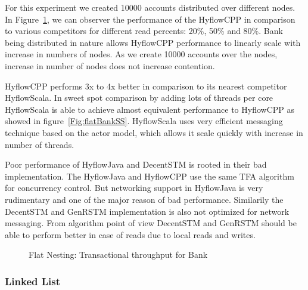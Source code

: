 \documentclass[12pt,english]{report}
\begin{document}
For this experiment we created 10000 accounts distributed over different nodes. In Figure~\ref{Fig:flatBank}, we can observer the performance of the HyflowCPP in comparison to various competitors for different read percents: 20\%, 50\% and 80\%. Bank being distributed in nature allows HyflowCPP performance to linearly scale with increase in numbers of nodes. As we create 10000 accounts over the nodes, increase in number of nodes does not increase contention.

HyflowCPP performs 3x to 4x better in comparison to its nearest competitor HyflowScala. In sweet spot comparison by adding lots of threads per core HyflowScala is able to achieve almost equivalent performance to HyflowCPP as showed in figure~\ref{Fig:flatBankSS}. HyflowScala uses very efficient messaging technique based on the actor model, which allows it scale quickly with increase in number of threads.

Poor performance of HyflowJava and  DecentSTM is rooted in their bad implementation. The HyflowJava and HyflowCPP use the same TFA algorithm for concurrency control. But networking support in HyflowJava is very rudimentary and one of the major reason of bad performance. Similarily the DecentSTM and GenRSTM implementation is also not optimized for network messaging. From algorithm point of view DecentSTM and GenRSTM should be able to perform better in case of reads due to local reads and writes.

\begin{figure}
\centering
{}
\end{figure}

\begin{figure}[H]
\caption{Flat Nesting: Transactional throughput for Bank}
\label{Fig:flatBank}
\end{figure}

\subsubsection{Linked List}
\end{document}
